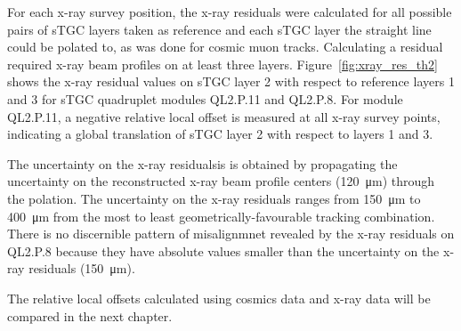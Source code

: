 For each x-ray survey position, the x-ray residuals were calculated for all possible pairs of sTGC layers taken as reference and each sTGC layer the straight line could be polated to, as was done for cosmic muon tracks. Calculating a residual required x-ray beam profiles on at least three layers. Figure~\ref{fig:xray_res_th2} shows the x-ray residual values on sTGC layer 2 with respect to reference layers 1 and 3 for sTGC quadruplet modules QL2.P.11 and QL2.P.8.  For module QL2.P.11, a negative relative local offset is measured at all x-ray survey points, indicating a global translation of sTGC layer 2 with respect to layers 1 and 3.

The uncertainty on the x-ray residualsis is obtained by propagating the uncertainty on the reconstructed x-ray beam profile centers (\SI{120}{\micro\meter}) through the polation. The uncertainty on the x-ray residuals ranges from \SI{150}{\micro\meter} to \SI{400}{\micro\meter} from the most to least geometrically-favourable tracking combination. There is no discernible pattern of misalignmnet revealed by the x-ray residuals on QL2.P.8 because they have absolute values smaller than the uncertainty on the x-ray residuals (\SI{150}{\micro\meter}). 

The relative local offsets calculated using cosmics data and x-ray data will be compared in the next chapter.
